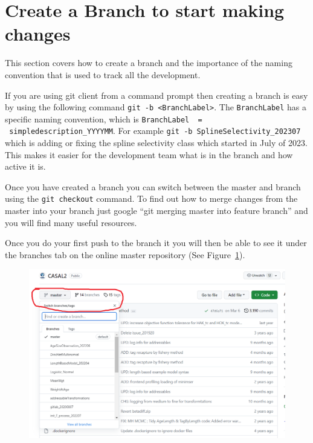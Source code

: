 \section{Create a Branch to start making changes\label{sec:maintain_repo}}

This section covers how to create a branch and the importance of the naming convention that is used to track all the development. 

If you are using git client from a command prompt then creating a branch is easy by using the following command \texttt{git -b <BranchLabel>}. The \texttt{BranchLabel} has a specific naming convention, which is  \texttt{BranchLabel \ = \ simpledescription\_YYYYMM}. For example \texttt{git -b SplineSelectivity\_202307} which is adding or fixing the spline selectivity class which started in July of 2023. This makes it easier for the development team what is in the branch and how active it is.

Once you have created a branch you can switch between the master and branch using the \texttt{git checkout} command. To find out how to merge changes from the master into your branch just google \enquote{git merging master into feature branch} and you will find many useful resources.

Once you do your first push to the branch it you will then be able to see it under the branches tab on the online master repository (See Figure~\ref{fig:branchtab}).

\begin{figure}[!ht]
	\centering
	\includegraphics[scale=0.6]{Figures/branch_tab.png}
	\caption{}\label{fig:branchtab}
\end{figure}
